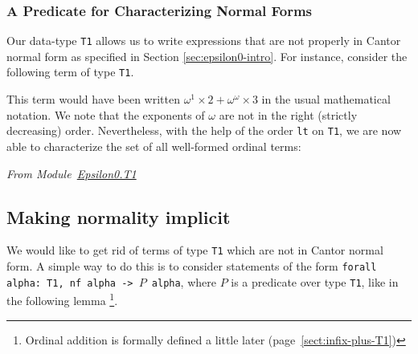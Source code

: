 


%

\subsubsection{A Predicate for Characterizing Normal Forms}
\label{sect:t1-nf}

\label{sec:orgheadline74}
\label{sec:orgheadline75}
Our data-type \texttt{T1} allows us to write expressions that
are not properly in Cantor normal form as specified in Section \ref{sec:epsilon0-intro}.
For instance, consider the following term of type  \texttt{T1}. 





This term would have been written \(\omega^1\times 2 + \omega^\omega \times 3\) in the usual mathematical notation. We note that the exponents of $\omega$ are not in the right (strictly decreasing) order.
Nevertheless, with the help of the order \texttt{lt} on \texttt{T1}, we are now able to characterize
the set of all well-formed ordinal terms:


\vspace{4pt}
\noindent
\emph{From Module~\href{../theories/html/hydras.Epsilon0.T1.html\#nf_b}{Epsilon0.T1}}

\label{Predicates:nf-T1}











\subsection{Making normality implicit}
  We would like to get rid of terms of type \texttt{T1} which are not in Cantor normal form.
A simple way to do this is to consider statements of the form 
\texttt{forall alpha: T1, nf alpha -> $P$ alpha}, where $P$ is a predicate over type \texttt{T1}, like in the following lemma \footnote{Ordinal addition is formally defined a little later (page~\ref{sect:infix-plus-T1})}.

